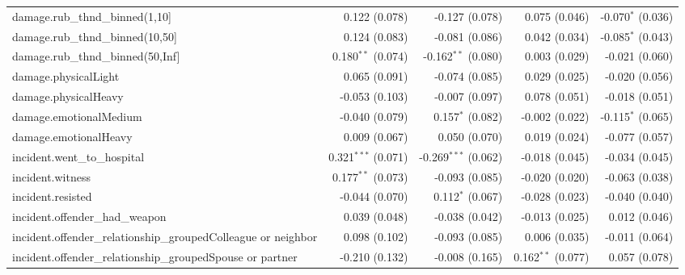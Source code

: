 \begin{tabular}{lrrrr}
	damage.rub\_thnd\_binned(1,10]                                  & 0.122 (0.078)          & -0.127 (0.078)         & 0.075 (0.046)         & -0.070$^{*}$ (0.036)\\   
	damage.rub\_thnd\_binned(10,50]                                 & 0.124 (0.083)          & -0.081 (0.086)         & 0.042 (0.034)         & -0.085$^{*}$ (0.043)\\   
	damage.rub\_thnd\_binned(50,Inf]                                & 0.180$^{**}$ (0.074)   & -0.162$^{**}$ (0.080)  & 0.003 (0.029)         & -0.021 (0.060)\\   
	damage.physicalLight                                            & 0.065 (0.091)          & -0.074 (0.085)         & 0.029 (0.025)         & -0.020 (0.056)\\   
	damage.physicalHeavy                                            & -0.053 (0.103)         & -0.007 (0.097)         & 0.078 (0.051)         & -0.018 (0.051)\\   
	damage.emotionalMedium                                          & -0.040 (0.079)         & 0.157$^{*}$ (0.082)    & -0.002 (0.022)        & -0.115$^{*}$ (0.065)\\   
	damage.emotionalHeavy                                           & 0.009 (0.067)          & 0.050 (0.070)          & 0.019 (0.024)         & -0.077 (0.057)\\   
	incident.went\_to\_hospital                                     & 0.321$^{***}$ (0.071)  & -0.269$^{***}$ (0.062) & -0.018 (0.045)        & -0.034 (0.045)\\   
	incident.witness                                                & 0.177$^{**}$ (0.073)   & -0.093 (0.085)         & -0.020 (0.020)        & -0.063 (0.038)\\   
	incident.resisted                                               & -0.044 (0.070)         & 0.112$^{*}$ (0.067)    & -0.028 (0.023)        & -0.040 (0.040)\\   
	incident.offender\_had\_weapon                                  & 0.039 (0.048)          & -0.038 (0.042)         & -0.013 (0.025)        & 0.012 (0.046)\\   
	incident.offender\_relationship\_groupedColleague or neighbor   & 0.098 (0.102)          & -0.093 (0.085)         & 0.006 (0.035)         & -0.011 (0.064)\\   
	incident.offender\_relationship\_groupedSpouse or partner       & -0.210 (0.132)         & -0.008 (0.165)         & 0.162$^{**}$ (0.077)  & 0.057 (0.078)\\   

\end{tabular}
